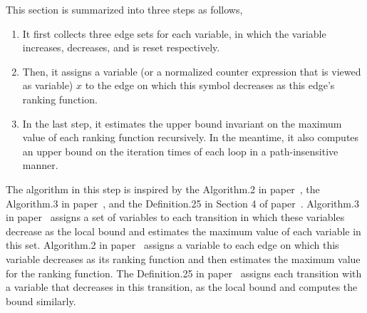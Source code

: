 This section is summarized into three steps as follows,
\begin{enumerate}
 \item It first collects three edge sets for each variable,
 in which the variable increases, decreases, and is reset respectively.
 \item
 Then, it assigns a variable (or a normalized counter expression that is viewed as variable) $x$ to the edge on which this symbol decreases as this edge's ranking function.
 \item
 In the last step, it estimates the upper bound invariant on the maximum value of each ranking function recursively.
 In the meantime, it also computes an upper bound on the iteration times of each loop in a path-insensitive manner.
 \end{enumerate}

 The algorithm in this step is inspired by the Algorithm.2 in paper~\cite{SinnZV14},
 the Algorithm.3 in paper~\cite{ZulegerGSV11},
 and the Definition.25 in Section 4 of paper~\cite{SinnZV17}.
 Algorithm.3 in paper~\cite{ZulegerGSV11} assigns a set of variables to each transition in which these variables decrease as the local bound
 and estimates the maximum value of each variable in this set.
 Algorithm.2 in paper~\cite{SinnZV14} assigns a variable to each edge on which this variable decreases as its ranking function
 and then estimates the maximum value for the ranking function.
 The Definition.25 in paper~\cite{SinnZV17}
 assigns each transition with a variable that decreases in this transition, as the local bound and computes the bound similarly.
